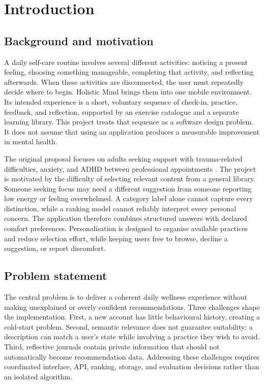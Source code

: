 \section{Introduction}\label{sec:chapter-1}

\subsection{Background and motivation}

A daily self-care routine involves several different activities: noticing a present feeling, choosing something manageable, completing that activity, and reflecting afterwards. When these activities are disconnected, the user must repeatedly decide where to begin. Holistic Mind brings them into one mobile environment. Its intended experience is a short, voluntary sequence of check-in, practice, feedback, and reflection, supported by an exercise catalogue and a separate learning library. This project treats that sequence as a software design problem. It does not assume that using an application produces a measurable improvement in mental health.

The original proposal focuses on adults seeking support with trauma-related difficulties, anxiety, and ADHD between professional appointments \citep{shrestha2026a}. The project is motivated by the difficulty of selecting relevant content from a general library. Someone seeking focus may need a different suggestion from someone reporting low energy or feeling overwhelmed. A category label alone cannot capture every distinction, while a ranking model cannot reliably interpret every personal concern. The application therefore combines structured answers with declared comfort preferences. Personalisation is designed to organise available practices and reduce selection effort, while keeping users free to browse, decline a suggestion, or report discomfort.

\subsection{Problem statement}

The central problem is to deliver a coherent daily wellness experience without making unexplained or overly confident recommendations. Three challenges shape the implementation. First, a new account has little behavioural history, creating a cold-start problem. Second, semantic relevance does not guarantee suitability: a description can match a user's state while involving a practice they wish to avoid. Third, reflective journals contain private information that should not automatically become recommendation data. Addressing these challenges requires coordinated interface, API, ranking, storage, and evaluation decisions rather than an isolated algorithm.

